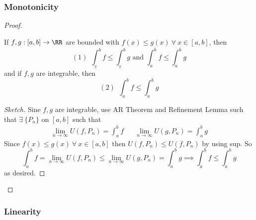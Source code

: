 \documentclass[12pt]{scrartcl}
\newcommand{\lint}{\int_{\overset{a}{\_}}^{b}}
\newcommand{\uint}{\int_a^{\bar{b}}}
\begin{document}
\subsubsection{Monotonicity}

\begin{proof}

\hfill

\begin{theorem}
  If $f, g: [a,b] \to \RR$ are bounded with $f(x) \leq g(x) \ \forall \ x \in [a,b]$, 
  then 
  \[(1) \ \ \lint f \leq \lint g \text{ and } \uint f \leq \uint g\]
  and if $f, g$ are integrable, then
  \[(2) \ \ \int_a^b f \leq \int_a^b g\]
  \begin{proof}[Sketch]
      Sine $f, g$ are integrable, use AR Theorem and Refinement Lemma such that 
      $\exists \ \{P_n\}$ on $[a,b]$ such that 
      \begin{align*}
        \lim_{n\to\infty} U(f, P_n) = \int_a^b f && \lim_{n\to\infty} U(g, P_n) = \int_a^b g
      \end{align*}
      Since $f(x) \leq g(x) \ \forall \ x \in [a,b]$ then 
      $U(f, P_n) \leq U(f, P_n)$ by using sup. So
      \[\int_a^b f = \underset{n\to\infty}{\lim}U(f, P_n) \leq \lim_{n\to\infty}U(g, P_n) = \int_a^b g \implies \int_a^b f \leq \int_a^b g\]
      as desired.
  \end{proof}
\end{theorem}

\end{proof}

\subsubsection{Linearity}
\end{document}
